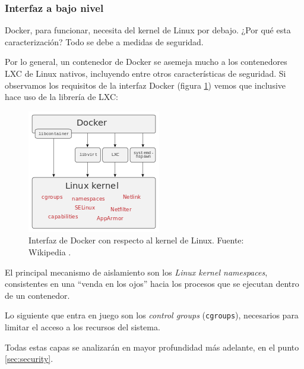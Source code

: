 \subsubsection*{Interfaz a bajo nivel}
Docker, para funcionar, necesita del kernel de Linux por debajo. ¿Por qué esta
caracterización? Todo se debe a medidas de seguridad.

Por lo general, un contenedor de Docker se asemeja mucho a los contenedores LXC 
de Linux nativos, incluyendo entre otros características de seguridad. Si observamos
los requisitos de la interfaz Docker (figura \ref{fig:docker-interface}) vemos que
inclusive hace uso de la librería de LXC:

\begin{figure}[H]
    \centering
    \includegraphics[width=.3\linewidth]{pictures/Docker-linux-interfaces.png}
    \caption{Interfaz de Docker con respecto al kernel de Linux. Fuente: Wikipedia \cite{DockerSoftware2021}.}
    \label{fig:docker-interface}
\end{figure}

El principal mecanismo de aislamiento son los \textit{Linux kernel namespaces},
consistentes en una ``venda en los ojos'' hacia los procesos que se ejecutan
dentro de un contenedor.

Lo siguiente que entra en juego son los \textit{control groups} (\texttt{cgroups}),
necesarios para limitar el acceso a los recursos del sistema.

Todas estas capas se analizarán en mayor profundidad más adelante, en el punto
\ref{sec:security}.
